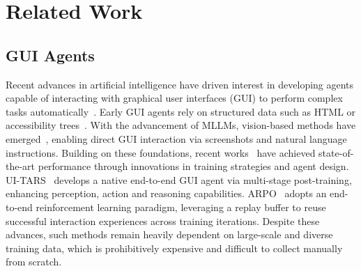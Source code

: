 \documentclass{article}
\theoremstyle{plain}
\theoremstyle{definition}
\theoremstyle{remark}
\begin{document}
\section{Related Work}
\subsection{GUI Agents}

Recent advances in artificial intelligence have driven  interest in developing agents capable of interacting with graphical user interfaces (GUI) to perform complex tasks automatically~\citep{qin2025ui, zhou2025mai}.
Early GUI agents rely on structured data such as HTML or accessibility trees~\citep{deng2023mind2web, gur2023real, yang2023set, he2024webvoyager, lai2024autowebglm}. With the advancement of MLLMs, vision-based methods have emerged~\citep{hong2024cogagent, zhang2024you, zhang2024android}, enabling direct GUI interaction via screenshots and natural language instructions.
Building on these foundations, recent works~\citep{qin2025ui, yan2025step, zeng2025uitron} have achieved state-of-the-art performance through innovations in training strategies and agent design. UI-TARS~\citep{qin2025ui} develops a native end-to-end GUI agent via multi-stage post-training, enhancing perception, action and reasoning capabilities. ARPO~\citep{lu2025arpo} adopts an end-to-end reinforcement learning paradigm, leveraging a replay buffer to reuse successful interaction experiences across training iterations. 
Despite these advances, such methods remain heavily dependent on large-scale and diverse training data, which is prohibitively expensive and difficult to collect manually from scratch.
\end{document}
